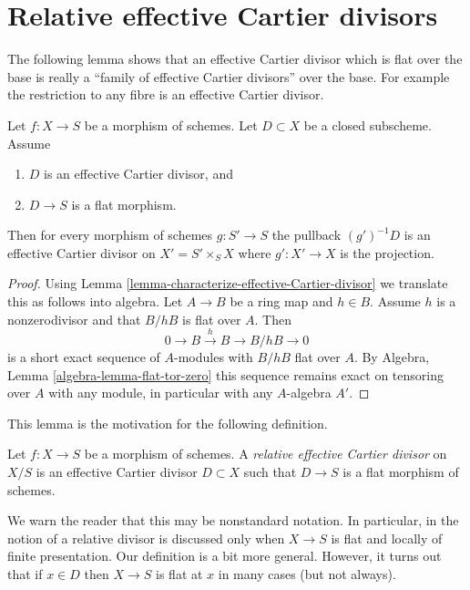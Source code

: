 \section{Relative effective Cartier divisors}
\label{section-effective-Cartier-morphisms}

\noindent
The following lemma shows that an effective Cartier divisor which is
flat over the base is really a ``family of effective Cartier divisors''
over the base. For example the restriction to any fibre is an effective
Cartier divisor.

\begin{lemma}
\label{lemma-relative-Cartier}
Let $f : X \to S$ be a morphism of schemes.
Let $D \subset X$ be a closed subscheme.
Assume
\begin{enumerate}
\item $D$ is an effective Cartier divisor, and
\item $D \to S$ is a flat morphism.
\end{enumerate}
Then for every morphism of schemes $g : S' \to S$ the pullback
$(g')^{-1}D$ is an effective Cartier divisor on $X' = S' \times_S X$
where $g' : X' \to X$ is the projection.
\end{lemma}

\begin{proof}
Using
Lemma \ref{lemma-characterize-effective-Cartier-divisor}
we translate this as follows into algebra. Let $A \to B$ be a ring
map and $h \in B$. Assume $h$ is a nonzerodivisor and that $B/hB$ is flat
over $A$. Then
$$
0 \to B \xrightarrow{h} B \to B/hB \to 0
$$
is a short exact sequence of $A$-modules with $B/hB$ flat over $A$. By
Algebra, Lemma \ref{algebra-lemma-flat-tor-zero}
this sequence remains exact on tensoring over $A$ with any module, in
particular with any $A$-algebra $A'$.
\end{proof}

\noindent
This lemma is the motivation for the following definition.

\begin{definition}
\label{definition-relative-effective-Cartier-divisor}
Let $f : X \to S$ be a morphism of schemes.
A {\it relative effective Cartier divisor} on $X/S$ is an
effective Cartier divisor $D \subset X$ such that $D \to S$
is a flat morphism of schemes.
\end{definition}

\noindent
We warn the reader that this may be nonstandard notation.
In particular, in \cite[IV, Section 21.15]{EGA} the notion of a
relative divisor is discussed only when $X \to S$ is flat and
locally of finite presentation. Our definition is a bit more general.
However, it turns out that if $x \in D$ then $X \to S$ is
flat at $x$ in many cases (but not always).

